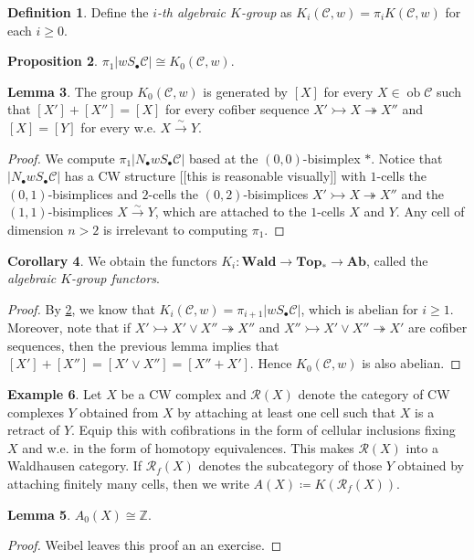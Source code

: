 \documentclass[10pt,letterpaper,cm]{nupset}
\theoremstyle{definition}
\newtheorem{definition}{Definition}
\newtheorem{exmp}[definition]{Example}
\theoremstyle{theorem}
\newtheorem{lemma}[definition]{Lemma}
\newtheorem{prop}[definition]{Proposition}
\newtheorem{corollary}[definition]{Corollary}
\theoremstyle{remark}
\newcommand{\Z}{\mathbb Z}
\newcommand{\1}{\mathbf{1}}
\renewcommand{\c}{\mathscr{C}}
\newcommand{\0}{\vec 0}
\DeclareMathOperator{\ob}{ob}
\begin{document}
\begin{definition}
Define the \textit{$i$-th algebraic $K$-group} as $K_i(\c, w) = \pi_iK(\c, w)$ for each $i\geq 0$. 
\end{definition}

\begin{prop}\label{P4}
$\pi_1|w S_{\bullet} \c| \cong K_0(\c, w)$.
\end{prop}

\begin{lemma}
The group $K_0(\c, w)$ is generated by $[X]$ for every $X \in \ob \c$ such that $[X'] + [X''] = [X]$ for every cofiber sequence $X' \rightarrowtail X \twoheadrightarrow X''$ and $[X] = [Y]$ for every w.e. $X \overset{\sim}{\longrightarrow} Y$.
\end{lemma}
\begin{proof}
We compute $\pi_1|N_{\bullet}w S_{\bullet} \c|$ based at the $(0,0)$-bisimplex $\ast$. Notice that $|N_{\bullet}w S_{\bullet} \c|$ has a CW structure {[[this is reasonable visually]]} with $1$-cells the $(0,1)$-bisimplices and $2$-cells the $(0,2)$-bisimplices $X' \rightarrowtail X \twoheadrightarrow X''$ and the $(1,1)$-bisimplices $X \overset{\sim}{\longrightarrow} Y$, which are attached to the $1$-cells $X$ and $Y$. Any cell of dimension $n>2$ is irrelevant to computing $\pi_1$.
\end{proof}

\begin{corollary}
We obtain the functors $K_i : \mathbf{Wald} \to \mathbf{Top_{\ast}} \to \mathbf{Ab}$, called the \textit{algebraic $K$-group functors}.
\end{corollary}
\begin{proof}
By \cref{P4}, we know that $K_i(\c, w) = \pi_{i+1}|w S_{\bullet} \c|$, which is abelian for $i\geq 1$. Moreover, note that if $X' \rightarrowtail X' \vee X'' \twoheadrightarrow X''$ and $X'' \rightarrowtail X' \vee X'' \twoheadrightarrow X'$ are cofiber sequences, then the previous lemma implies that $[X'] + [X''] = [X' \vee X''] = [X'' + X']$. Hence $K_0(\c, w)$ is also abelian.
\end{proof}

\begin{exmp}
Let $X$ be a CW complex and $\mathcal{R}(X)$ denote the category of CW complexes $Y$  obtained from $X$ by attaching at least one cell such that $X$ is a retract of $Y$. Equip this with cofibrations in the form of cellular inclusions fixing $X$ and w.e. in the form of homotopy equivalences. This makes $\mathcal{R}(X)$ into a Waldhausen category. If $\mathcal{R}_f(X)$ denotes the subcategory of those $Y$ obtained by attaching finitely many cells, then we write $A(X)\coloneqq K(\mathcal{R}_f(X))$.
\begin{lemma}
$A_0(X)\cong \Z$.
\end{lemma}
\begin{proof}
Weibel leaves this proof an an exercise.
\end{proof}
\end{exmp}
\end{document}
